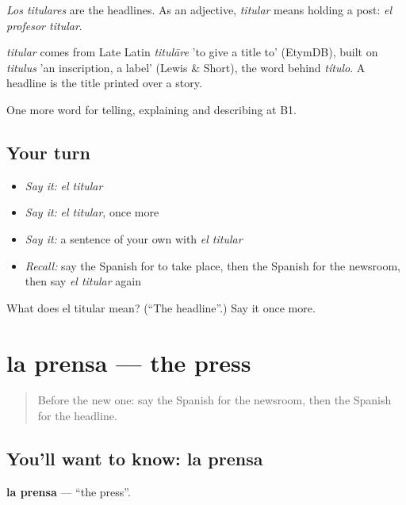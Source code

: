 \emph{Los titulares} are the headlines. As an adjective, \emph{titular} means holding a post: \emph{el profesor titular}.

\begin{cousinweb}
\emph{titular} comes from Late Latin \emph{titulāre} 'to give a title to' (EtymDB), built on \emph{titulus} 'an inscription, a label' (Lewis \& Short), the word behind \emph{título}. A headline is the title printed over a story.
\end{cousinweb}

\begin{grammarlens}[title={What you've built}]
One more word for telling, explaining and describing at B1.
\end{grammarlens}

\subsection*{Your turn}
\begin{itemize}
\raggedright
  \item \emph{Say it:} \emph{el titular}
  \item \emph{Say it:} \emph{el titular}, once more
  \item \emph{Say it:} a sentence of your own with \emph{el titular}
  \item \emph{Recall:} say the Spanish for to take place, then the Spanish for the newsroom, then say \emph{el titular} again
\end{itemize}

\begin{tcolorbox}[breakable,colback=teal!4,colframe=teal!35!black,title={Before you move on}]
What does el titular mean? (\textquotedblleft{}The headline\textquotedblright{}.) Say it once more.
\end{tcolorbox}
\section[la prensa]{la prensa — the press}

\label{lesson:ES-C513-prensa}



\begin{quote}
Before the new one: say the Spanish for the newsroom, then the Spanish for the headline.
\end{quote}

\subsection*{You'll want to know: la prensa}
\textbf{la prensa} — \textquotedblleft{}the press\textquotedblright{}.

